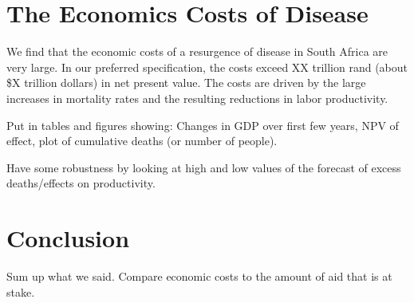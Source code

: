 \documentclass[letterpaper,12pt]{article}
\theoremstyle{definition}
\begin{document}
\begin{spacing}{1.5}
\section{The Economics Costs of Disease}\label{SecResults}

We find that the economic costs of a resurgence of disease in South Africa are very large.  In our preferred specification, the costs exceed XX trillion rand (about \$X trillion dollars) in net present value.  The costs are driven by the large increases in mortality rates and the resulting reductions in labor productivity.

Put in tables and figures showing: Changes in GDP over first few years, NPV of effect, plot of cumulative deaths (or number of people).

Have some robustness by looking at high and low values of the forecast of excess deaths/effects on productivity.

\section{Conclusion}\label{SecConc}

Sum up what we said.  Compare economic costs to the amount of aid that is at stake.

\end{spacing}
\newpage

\end{document}
